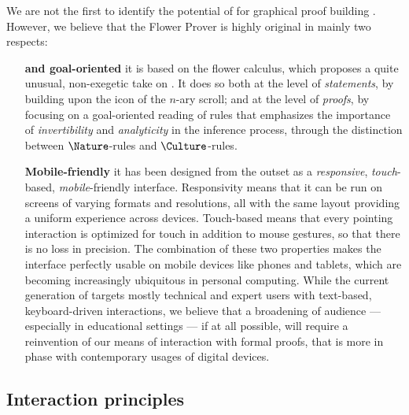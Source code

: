 We are not the first to identify the potential of  for graphical proof
building . However, we believe that the
Flower Prover is highly original in mainly two respects:
\begin{itemize}
  \item[\textbf{\kl{Intuitionistic} and goal-oriented}] it is based on the flower
  calculus, which proposes a quite unusual, non-exegetic take on . It does so
  both at the level of \emph{statements}, by building upon the 
  icon of the $n$-ary scroll; and at the level of \emph{proofs}, by focusing on
  a goal-oriented reading of rules that emphasizes the importance of
  \emph{invertibility} and \emph{analyticity} in the inference process, through
  the distinction between $\Nature$-rules and $\Culture$-rules.
  \item[\textbf{Mobile-friendly}] it has been designed from the outset as a
  \emph{responsive}, \emph{touch}-based, \emph{mobile}-friendly interface.
  Responsivity means that it can be run on screens of varying formats and
  resolutions, all with the same layout providing a uniform experience across
  devices. Touch-based means that every pointing interaction is optimized for
  touch in addition to mouse gestures, so that there is no loss in precision.
  The combination of these two properties makes the interface perfectly usable
  on mobile devices like phones and tablets, which are becoming increasingly
  ubiquitous in personal computing. While the current generation of  targets mostly technical and expert users with text-based,
  keyboard-driven interactions, we believe that a broadening of audience ---
  especially in educational settings --- if at all possible, will require a
  reinvention of our means of interaction with formal proofs, that is more in
  phase with contemporary usages of digital devices.
\end{itemize}

\subsection{Interaction principles}

